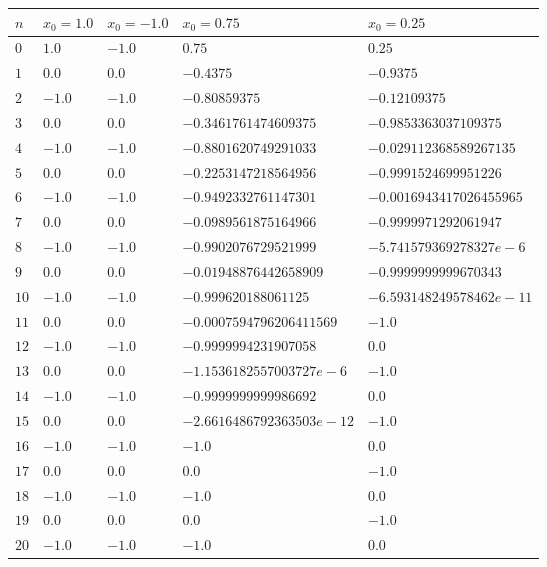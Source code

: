 \documentclass[12pt]{article}
\begin{document}
    \begin{table}[h!]
        \centering
        \begin{tabularx}{0.9\textwidth}{l l l l l}
            \hline
            $n$ & $x_0 = 1.0$ & $x_0 = -1.0$ & $x_0 = 0.75$ & $x_0 = 0.25$ \\
            \hline
            $0$ & $1.0$ & $-1.0$ & $0.75$ & $0.25$ \\
            $1$ & $0.0$ & $0.0$ & $-0.4375$ & $-0.9375$ \\
            $2$ & $-1.0$ & $-1.0$ & $-0.80859375$ & $-0.12109375$ \\
            $3$ & $0.0$ & $0.0$ & $-0.3461761474609375$ & $-0.9853363037109375$ \\
            $4$ & $-1.0$ & $-1.0$ & $-0.8801620749291033$ & $-0.029112368589267135$ \\
            $5$ & $0.0$ & $0.0$ & $-0.2253147218564956$ & $-0.9991524699951226$ \\
            $6$ & $-1.0$ & $-1.0$ & $-0.9492332761147301$ & $-0.0016943417026455965$ \\
            $7$ & $0.0$ & $0.0$ & $-0.0989561875164966$ & $-0.9999971292061947$ \\
            $8$ & $-1.0$ & $-1.0$ & $-0.9902076729521999$ & $-5.741579369278327e-6$ \\
            $9$ & $0.0$ & $0.0$ & $-0.01948876442658909$ & $-0.9999999999670343$ \\
            $10$ & $-1.0$ & $-1.0$ & $-0.999620188061125$ & $-6.593148249578462e-11$ \\
            $11$ & $0.0$ & $0.0$ & $-0.0007594796206411569$ & $-1.0$ \\
            $12$ & $-1.0$ & $-1.0$ & $-0.9999994231907058$ & $0.0$ \\
            $13$ & $0.0$ & $0.0$ & $-1.1536182557003727e-6$ & $-1.0$ \\
            $14$ & $-1.0$ & $-1.0$ & $-0.9999999999986692$ & $0.0$ \\
            $15$ & $0.0$ & $0.0$ & $-2.6616486792363503e-12$ & $-1.0$ \\
            $16$ & $-1.0$ & $-1.0$ & $-1.0$ & $0.0$ \\
            $17$ & $0.0$ & $0.0$ & $0.0$ & $-1.0$ \\
            $18$ & $-1.0$ & $-1.0$ & $-1.0$ & $0.0$ \\
            $19$ & $0.0$ & $0.0$ & $0.0$ & $-1.0$ \\
            $20$ & $-1.0$ & $-1.0$ & $-1.0$ & $0.0$ \\

\end{tabularx}
\end{table}
\end{document}
